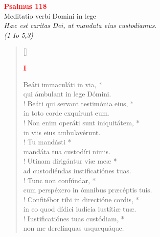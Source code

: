 


\def\greinitialformat#1{%
{\fontsize{39}{39}\selectfont #1}%
}




\vspace{0.3cm}
\begin{center}
 \textcolor{red}{\large \bf Psalmus 118}\\
Meditatio verbi Domini in lege\\
\textit{\small Hæc est caritas Dei, ut mandata eius custodiamus.\\(1 Io 5,3)}
\end{center}
\begin{verse}[\versewidth]
\begin{center}
\textcolor{red}{\bf I}\\
\end{center}
Beáti immaculáti in via, *\\
qui ámbulant in lege Dómini.\\!
\vin Beáti qui servant testimónia eius, *\\
\vin in toto corde exquírunt eum.\\!
Non enim operáti sunt iniquitátem, *\\
in viis eius ambulavérunt.\\!
\vin Tu mandásti *\\
\vin mandáta tua custodíri nimis.\\!
Utinam dirigántur viæ meæ *\\
ad custodiéndas iustificatiónes tuas.\\!
\vin Tunc non confúndar, *\\
\vin cum perspéxero in ómnibus præcéptis tuis.\\!
Confitébor tibi in directióne cordis, *\\
in eo quod dídici iudícia iustítiæ tuæ.\\!
\vin Iustificatiónes tuas custódiam, *\\
\vin non me derelínquas usquequáque.\\
\end{verse}
